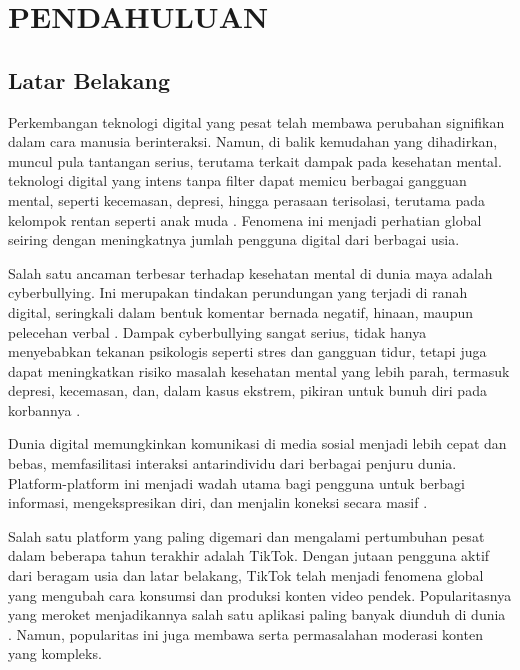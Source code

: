 \newpage
\pagestyle{fancy}
\fancyhf{}
\fancyhead[R]{\thepage}
\chapter{PENDAHULUAN} \label{Bab I}

\section{Latar Belakang} \label{I.Latar Belakang}

Perkembangan teknologi digital yang pesat telah membawa perubahan signifikan dalam cara manusia berinteraksi. Namun, di balik kemudahan yang dihadirkan, muncul pula tantangan serius, terutama terkait dampak pada kesehatan mental. teknologi digital yang intens tanpa filter dapat memicu berbagai gangguan mental, seperti kecemasan, depresi, hingga perasaan terisolasi, terutama pada kelompok rentan seperti anak muda \cite{sembiring2024dampak}. Fenomena ini menjadi perhatian global seiring dengan meningkatnya jumlah pengguna digital dari berbagai usia.

Salah satu ancaman terbesar terhadap kesehatan mental di dunia maya adalah cyberbullying. Ini merupakan tindakan perundungan yang terjadi di ranah digital, seringkali dalam bentuk komentar bernada negatif, hinaan, maupun pelecehan verbal \cite{putri2023cyberbullying}. Dampak cyberbullying sangat serius, tidak hanya menyebabkan tekanan psikologis seperti stres dan gangguan tidur, tetapi juga dapat meningkatkan risiko masalah kesehatan mental yang lebih parah, termasuk depresi, kecemasan, dan, dalam kasus ekstrem, pikiran untuk bunuh diri pada korbannya \cite{kurniawan2024dampak}.

Dunia digital memungkinkan komunikasi di media sosial menjadi lebih cepat dan bebas, memfasilitasi interaksi antarindividu dari berbagai penjuru dunia. Platform-platform ini menjadi wadah utama bagi pengguna untuk berbagi informasi, mengekspresikan diri, dan menjalin koneksi secara masif \cite{sari2018komunikasi}.

Salah satu platform yang paling digemari dan mengalami pertumbuhan pesat dalam beberapa tahun terakhir adalah TikTok. Dengan jutaan pengguna aktif dari beragam usia dan latar belakang, TikTok telah menjadi fenomena global yang mengubah cara konsumsi dan produksi konten video pendek. Popularitasnya yang meroket menjadikannya salah satu aplikasi paling banyak diunduh di dunia \cite{rosiana2023analisis}. Namun, popularitas ini juga membawa serta permasalahan moderasi konten yang kompleks.

